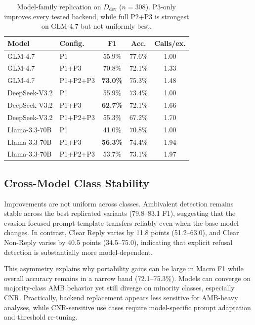 \documentclass[11pt]{article}
\newcommand{\rev}[1]{#1}
\begin{document}
\begin{table}[t]
\centering
\footnotesize
\setlength{\tabcolsep}{3pt}
\begin{tabular}{@{}llccc@{}}
\toprule
\textbf{Model} & \textbf{Config.} & \textbf{F1} & \textbf{Acc.} & \textbf{Calls/ex.} \\
\midrule
GLM-4.7 & P1 & 55.9\% & 77.6\% & 1.00 \\
GLM-4.7 & P1+P3 & 70.8\% & 72.1\% & 1.33 \\
GLM-4.7 & P1+P2+P3 & \textbf{73.0\%} & 75.3\% & 1.48 \\
DeepSeek-V3.2 & P1 & 55.9\% & 73.4\% & 1.00 \\
DeepSeek-V3.2 & P1+P3 & \textbf{62.7\%} & 72.1\% & 1.66 \\
DeepSeek-V3.2 & P1+P2+P3 & 55.3\% & 67.2\% & 1.70 \\
Llama-3.3-70B & P1 & 41.0\% & 70.8\% & 1.00 \\
Llama-3.3-70B & P1+P3 & \textbf{56.3\%} & 74.4\% & 1.94 \\
Llama-3.3-70B & P1+P2+P3 & 53.7\% & 73.1\% & 1.97 \\
\bottomrule
\end{tabular}
\caption{Model-family replication on $D_{\text{dev}}$ ($n{=}308$). P3-only improves every tested backend, while full P2+P3 is strongest on GLM-4.7 but not uniformly best.}
\label{tab:portability}
\end{table}

\subsection{Cross-Model Class Stability}
\label{sec:stability}

Improvements are not uniform across classes. Ambivalent detection remains stable across the best replicated variants (79.8--83.1 F1), suggesting that the evasion-focused prompt template transfers reliably even when the base model changes. In contrast, Clear Reply varies by 11.8 points (51.2--63.0), and Clear Non-Reply varies by 40.5 points (34.5--75.0), indicating that explicit refusal detection is substantially more model-dependent.

This asymmetry explains why portability gains can be large in Macro F1 while overall accuracy remains in a narrow band (72.1--75.3\%). Models can converge on majority-class AMB behavior yet still diverge on minority classes, especially CNR. Practically, \rev{backend replacement appears less sensitive for AMB-heavy analyses, while CNR-sensitive use cases require model-specific prompt adaptation and threshold re-tuning.}
\end{document}
